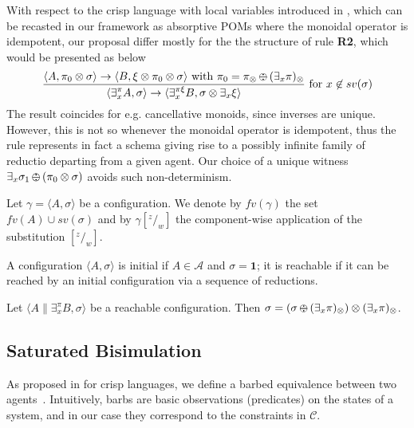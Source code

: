 \documentclass{llncs}
\def\1{{\mathbf 1}}
\def\1{{\mathbf 1}}
\def\odiv{\, {\ominus\hspace{-7.7pt} \div} \,}
\begin{document}
\begin{remark}
With respect to the crisp language with local variables introduced in \cite{pippo},
which can be recasted in our framework as absorptive POMs
where the monoidal operator is idempotent,
our proposal differ mostly for the the structure of rule \mbox{\bf R2}, which would 
be presented as below
   $$\frac {\displaystyle \langle A, \pi_0 \otimes \sigma \rangle
    \to \langle B, \xi \otimes \pi_0 \otimes \sigma \rangle \text{ with } \pi_0 = \pi_\otimes \odiv (\exists_x \pi)_\otimes}
    {\displaystyle\langle \exists^{\pi}_x A,\sigma\rangle \to \langle 
    \exists^{\pi \xi}_x B, \sigma \otimes \exists_x \xi
    \rangle} \text{ for } x \not \in sv(\sigma)$$
The result coincides for e.g. cancellative monoids, since inverses are unique.
However, this is not so whenever the monoidal operator is idempotent, thus 
the rule represents in fact a schema giving rise to a possibly infinite
family of reductio departing from a given agent. Our choice of a unique witness 
$\exists_x \sigma_1 \odiv (\pi_0 \otimes \sigma)$ avoids such non-determinism.
\end{remark}

Let $\gamma = \langle A, \sigma \rangle$ be a configuration.
%
We denote by $fv(\gamma)$ the set $fv(A) \cup sv(\sigma)$ and by
$\gamma[^z/_w]$ the component-wise application of the substitution $[^z/_w]$.

\begin{definition}
A configuration $\langle A, \sigma \rangle$ is initial if $A\in \mathcal{A}$
and $\sigma = \1$; it is reachable if it can be reached by an initial configuration 
via a sequence of reductions.
\end{definition}

\begin{lemma}[On monotonicity, II]
\label{mono2}
Let $\langle A \parallel \exists_x^\pi B, \sigma \rangle$ 
be a reachable configuration.
Then $\sigma = (\sigma \odiv (\exists_x \pi)_\otimes) \otimes (\exists_x \pi)_\otimes$.
\end{lemma}




\subsection{Saturated Bisimulation}\label{sec:saturated}
As proposed in \cite{pippo} for crisp languages, we define a barbed equivalence between two agents~\cite{barbed}.  
%
Intuitively, barbs are basic observations (predicates) on the states of a system, and in our case they correspond 
to the constraints in $\mathcal{C}$.
\end{document}
